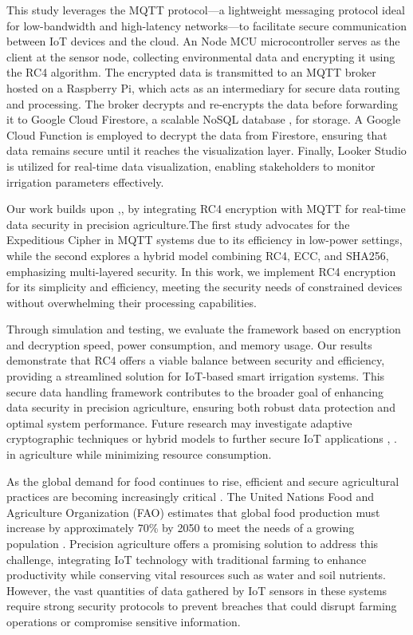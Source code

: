 \documentclass[conference]{IEEEtran}
\begin{document}
This study leverages the MQTT protocol—a lightweight messaging protocol ideal for low-bandwidth and high-latency networks—to facilitate secure communication between IoT devices and the cloud. An Node MCU microcontroller serves as the client at the sensor node, collecting environmental data and encrypting it using the RC4 algorithm. The encrypted data is transmitted to an MQTT broker hosted on a Raspberry Pi, which acts as an intermediary for secure data routing and processing. The broker decrypts and re-encrypts the data before forwarding it to Google Cloud Firestore, a scalable NoSQL database \cite{ref14}, for storage. A Google Cloud Function is employed to decrypt the data from Firestore, ensuring that data remains secure until it reaches the visualization layer. Finally, Looker Studio is utilized for real-time data visualization, enabling stakeholders to monitor irrigation parameters effectively.

Our work builds upon \cite{ref1},\cite{ref2},\cite{ref9} by integrating RC4 encryption with MQTT for real-time data security in precision agriculture.The first study advocates for the Expeditious Cipher in MQTT systems due to its efficiency in low-power settings, while the second explores a hybrid model combining RC4, ECC, and SHA256, emphasizing multi-layered security. In this work, we implement RC4 encryption for its simplicity and efficiency, meeting the security needs of constrained devices without overwhelming their processing capabilities.

Through simulation and testing, we evaluate the framework based on encryption and decryption speed, power consumption, and memory usage. Our results demonstrate that RC4 offers a viable balance between security and efficiency, providing a streamlined solution for IoT-based smart irrigation systems. This secure data handling framework contributes to the broader goal of enhancing data security in precision agriculture, ensuring both robust data protection and optimal system performance. Future research may investigate adaptive cryptographic techniques or hybrid models to further secure IoT applications \cite{ref9}, \cite{ref10}. in agriculture while minimizing resource consumption.

As the global demand for food continues to rise, efficient and secure agricultural practices are becoming increasingly critical \cite{ref3}. The United Nations Food and Agriculture Organization (FAO) estimates that global food production must increase by approximately 70\% by 2050 to meet the needs of a growing population \cite{ref3}. Precision agriculture offers a promising solution to address this challenge, integrating IoT technology with traditional farming to enhance productivity while conserving vital resources such as water and soil nutrients. However, the vast quantities of data gathered by IoT sensors in these systems require strong security protocols to prevent breaches that could disrupt farming operations or compromise sensitive information.
\end{document}
